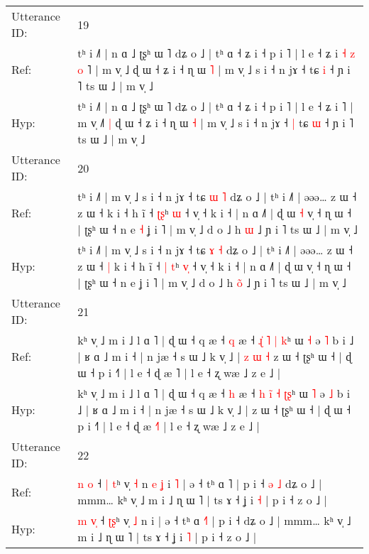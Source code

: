 \documentclass[10pt]{article}
\DeclareRobustCommand{\hl}[1]{{\textcolor{red}{#1}}}
\begin{document}
\begin{longtable}{ll}
 \\
\midrule
Utterance ID: & 19 \\
Ref: & tʰ i ˩˥ | n ɑ ˩ ʈʂʰ ɯ ˥ dʑ o ˩ | tʰ ɑ ˧ ʑ i ˧ p i ˥ | l e ˧ ʑ i\hl{ }\hl{˧}\hl{ }\hl{z}\hl{ }\hl{o} ˥ | m v̩ ˩\hl{}\hl{}\hl{} ɖ ɯ ˧ ʑ i ˧ ɳ ɯ \hl{˥} | m v̩ ˩ s i ˧ n jɤ ˧\hl{}\hl{} tɕ \hl{i} ˧ ɲ i ˥ ts ɯ ˩ | m v̩ ˩
 \\
Hyp: & tʰ i ˩˥ | n ɑ ˩ ʈʂʰ ɯ ˥ dʑ o ˩ | tʰ ɑ ˧ ʑ i ˧ p i ˥ | l e ˧ ʑ i\hl{}\hl{}\hl{}\hl{}\hl{}\hl{} ˥ | m v̩ ˩\hl{˥}\hl{ }\hl{|} ɖ ɯ ˧ ʑ i ˧ ɳ ɯ \hl{˧} | m v̩ ˩ s i ˧ n jɤ ˧\hl{ }\hl{|} tɕ \hl{ɯ} ˧ ɲ i ˥ ts ɯ ˩ | m v̩ ˩
 \\
\midrule
Utterance ID: & 20 \\
Ref: & tʰ i ˩˥ | m v̩ ˩ s i ˧ n jɤ ˧ tɕ \hl{ɯ} \hl{˥} dʑ o ˩ | tʰ i ˩˥ | əəə… z ɯ ˧ z ɯ ˧\hl{}\hl{} k i ˧ h ĩ ˧ \hl{}\hl{ʈ}\hl{ʂ}ʰ \hl{}\hl{ɯ} ˧ v̩ ˧ k i ˧ | n ɑ ˩˥ | ɖ ɯ\hl{ }\hl{˧} v̩ ˧ ɳ ɯ ˧ | ʈʂʰ ɯ ˧ n e\hl{ }\hl{˧} ʝ i ˥ | m v̩ ˩ d o ˩ h \hl{}\hl{ɯ} ˩ ɲ i ˥ ts ɯ ˩ | m v̩ ˩
 \\
Hyp: & tʰ i ˩˥ | m v̩ ˩ s i ˧ n jɤ ˧ tɕ \hl{ɤ} \hl{˧} dʑ o ˩ | tʰ i ˩˥ | əəə… z ɯ ˧ z ɯ ˧\hl{ }\hl{|} k i ˧ h ĩ ˧ \hl{|}\hl{ }\hl{t}ʰ \hl{v}\hl{̩} ˧ v̩ ˧ k i ˧ | n ɑ ˩˥ | ɖ ɯ\hl{}\hl{} v̩ ˧ ɳ ɯ ˧ | ʈʂʰ ɯ ˧ n e\hl{}\hl{} ʝ i ˥ | m v̩ ˩ d o ˩ h \hl{o}\hl{̃} ˩ ɲ i ˥ ts ɯ ˩ | m v̩ ˩
 \\
\midrule
Utterance ID: & 21 \\
Ref: & kʰ v̩ ˩ m i ˩ l ɑ ˥ | ɖ ɯ ˧ q æ ˧ \hl{q} æ ˧ \hl{ɻ}\hl{̍}\hl{ }\hl{˥} \hl{|} \hl{}\hl{k}ʰ ɯ \hl{˧} ə \hl{˥} b i ˩ | ʁ ɑ ˩ m i ˧ | n jæ ˧ s ɯ ˩ k v̩ ˩ |\hl{ }\hl{z}\hl{ }\hl{ɯ}\hl{ }\hl{˧} z ɯ ˧ ʈʂʰ ɯ ˧ | ɖ ɯ ˧ p i ˧˥ | l e ˧ ɖ æ \hl{}˥ | l e ˧ ʐ wæ ˩ z e ˩ |
 \\
Hyp: & kʰ v̩ ˩ m i ˩ l ɑ ˥ | ɖ ɯ ˧ q æ ˧ \hl{h} æ ˧ \hl{h}\hl{ }\hl{i}\hl{̃} \hl{˧} \hl{ʈ}\hl{ʂ}ʰ ɯ \hl{˥} ə \hl{˩} b i ˩ | ʁ ɑ ˩ m i ˧ | n jæ ˧ s ɯ ˩ k v̩ ˩ |\hl{}\hl{}\hl{}\hl{}\hl{}\hl{} z ɯ ˧ ʈʂʰ ɯ ˧ | ɖ ɯ ˧ p i ˧˥ | l e ˧ ɖ æ \hl{˧}˥ | l e ˧ ʐ wæ ˩ z e ˩ |
 \\
\midrule
Utterance ID: & 22 \\
Ref: & \hl{n} \hl{}\hl{o} ˧ \hl{|}\hl{ }\hl{t}ʰ v̩ \hl{˧} n\hl{ }\hl{e}\hl{ }\hl{ʝ} i\hl{ }\hl{˥} | ə ˧ tʰ ɑ \hl{}˥ | p i ˧\hl{ }\hl{ə}\hl{ }\hl{˩} dʑ o ˩ | mmm… kʰ v̩ ˩ m i ˩ ɳ ɯ ˥ | ts ɤ ˧ ʝ i \hl{˧} | p i ˧ z o ˩ |
 \\
Hyp: & \hl{m} \hl{v}\hl{̩} ˧ \hl{}\hl{ʈ}\hl{ʂ}ʰ v̩ \hl{˩} n\hl{}\hl{}\hl{}\hl{} i\hl{}\hl{} | ə ˧ tʰ ɑ \hl{˧}˥ | p i ˧\hl{}\hl{}\hl{}\hl{} dʑ o ˩ | mmm… kʰ v̩ ˩ m i ˩ ɳ ɯ ˥ | ts ɤ ˧ ʝ i \hl{˥} | p i ˧ z o ˩ |
 \\

\end{longtable}
\end{document}
